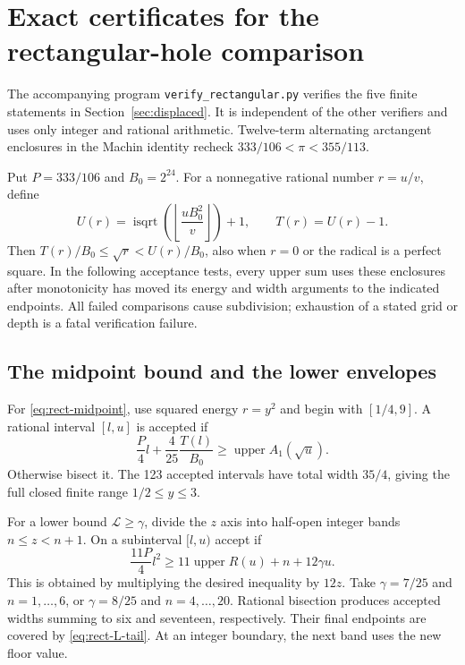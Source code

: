 \documentclass[11pt,reqno]{amsart}
\numberwithin{equation}{section}
\begin{document}
\section{Exact certificates for the rectangular-hole comparison}\label{app:displaced-certificate}

The accompanying program \texttt{verify\_rectangular.py}
verifies the five finite statements in Section~\ref{sec:displaced}.
It is independent of the other verifiers and uses only integer and
rational arithmetic. Twelve-term alternating arctangent enclosures
in the Machin identity recheck
$333/106<\pi<355/113$.

Put $P=333/106$ and $B_0=2^{24}$. For a nonnegative rational
number $r=u/v$, define
\begin{equation}\label{eq:rect-root-enclosure}
 U(r)=\operatorname{isqrt}\left(\left\lfloor
                  \frac{uB_0^2}{v}\right\rfloor\right)+1,
 \qquad T(r)=U(r)-1.
\end{equation}
Then $T(r)/B_0\le\sqrt r<U(r)/B_0$, also when $r=0$
or the radical is a perfect square. In the following acceptance
tests, every upper sum uses these enclosures after monotonicity
has moved its energy and width arguments to the indicated
endpoints. All failed comparisons cause subdivision; exhaustion
of a stated grid or depth is a fatal verification failure.

\subsection*{The midpoint bound and the lower envelopes}

For \eqref{eq:rect-midpoint}, use squared energy $r=y^2$ and
begin with $[1/4,9]$. A rational interval $[l,u]$ is accepted if
\begin{equation}\label{eq:rect-midpoint-box}
 \frac P4l+\frac4{25}\frac{T(l)}{B_0}
 \ge\operatorname{upper}A_1(\sqrt u).
\end{equation}
Otherwise bisect it. The 123 accepted intervals have total
width $35/4$, giving the full closed finite range
$1/2\le y\le3$.

For a lower bound $\mathcal L\ge\gamma$, divide the $z$
axis into half-open integer bands $n\le z<n+1$. On a
subinterval $[l,u)$ accept if
\begin{equation}\label{eq:rect-L-box}
 \frac{11P}{4}l^2
 \ge11\operatorname{upper}R(u)+n+12\gamma u.
\end{equation}
This is obtained by multiplying the desired inequality by
$12z$. Take $\gamma=7/25$ and $n=1,\ldots,6$, or
$\gamma=8/25$ and $n=4,\ldots,20$. Rational bisection
produces accepted widths summing to six and seventeen,
respectively. Their final endpoints are covered by
\eqref{eq:rect-L-tail}. At an integer boundary, the next
band uses the new floor value.
\end{document}
